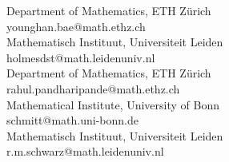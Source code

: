  {Department of Mathematics, ETH Z\"urich} \\
 {younghan.bae@math.ethz.ch}\\

 {Mathematisch Instituut, Universiteit Leiden} \\
 {holmesdst@math.leidenuniv.nl}\\

 {Department of Mathematics, ETH Z\"urich} \\
 {rahul.pandharipande@math.ethz.ch}\\

 {Mathematical Institute, University of Bonn} \\
 {schmitt@math.uni-bonn.de}\\

 {Mathematisch Instituut, Universiteit Leiden} \\
 {r.m.schwarz@math.leidenuniv.nl}\\

